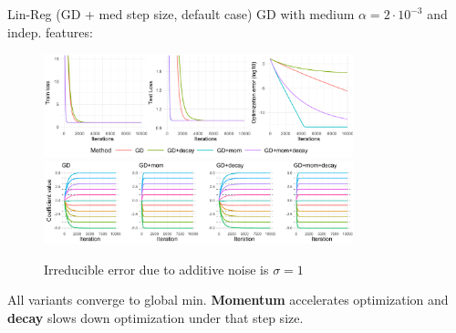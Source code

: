 \documentclass[11pt,compress,t,notes=noshow, xcolor=table]{beamer}
\begin{document}
\begin{vbframe}{Lin-Reg (GD + med step size, default case)}
\vspace{-0.4cm}
GD with medium $\alpha=2\cdot10^{-3}$ and indep. features:
\begin{figure}
            \includegraphics[width=0.8\textwidth]{slides/04-multivariate-first-order/figure_man/simu_linmod/GD_reg_med_lr_iters.pdf} \\
             \includegraphics[width=0.8\textwidth]{slides/04-multivariate-first-order/figure_man/simu_linmod/GD_reg_coef_med.pdf}\\
            \begin{footnotesize}
                Irreducible error due to additive noise is $\sigma=1$
            \end{footnotesize}
\end{figure}
All variants converge to global min. \textbf{Momentum} accelerates optimization and \textbf{decay} slows down optimization under that step size.
\end{vbframe}
\end{document}
